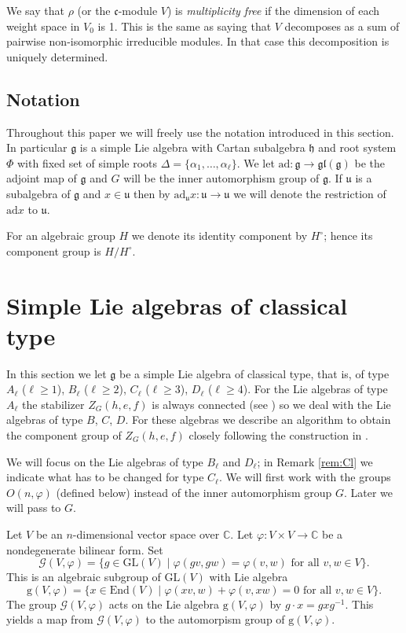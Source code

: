 \documentclass[a4paper,10pt]{amsart}
\newcommand{\C}{\mathbb{C}}
\newcommand{\GL}{\mathrm{GL}}
\newcommand{\mf}{\mathfrak}
\newcommand{\g}{\mf{g}}
\newcommand{\h}{\mf{h}}
\newcommand{\gl}{\mf{gl}}
\newcommand{\uu}{\mf{u}}
\renewcommand{\c}{\mf{c}}
\newcommand{\End}{\mathrm{End}}
\newcommand{\ad}{\mathrm{ad}}
\newcommand{\G}{\mathcal{G}}
\renewcommand{\ggg}{\mathrm{g}}
\numberwithin{equation}{section}
\theoremstyle{remark}
\theoremstyle{remark}
\begin{document}
We say that $\rho$ (or the $\c$-module $V$) is {\em multiplicity free} if
the dimension of each weight space in $V_0$ is 1. This is the same as
saying that $V$ decomposes as a sum of pairwise non-isomorphic irreducible
modules. In that case this decomposition is uniquely determined. 


\subsection{Notation}

Throughout this paper we will freely use the notation introduced in this
section. In particular $\g$ is a simple Lie algebra with Cartan subalgebra
$\h$ and root system $\Phi$ with fixed set of simple roots $\Delta = \{
\alpha_1,\ldots,\alpha_\ell\}$. We let $\ad : \g \to \gl(\g)$ be the
adjoint map of $\g$ and $G$ will be the inner automorphism group of $\g$.
If $\uu$ is a subalgebra of $\g$ and $x\in \uu$ then by $\ad_\uu x :
\uu\to\uu$ we will denote the restriction of $\ad x$ to $\uu$.

For an algebraic group $H$ we denote its identity component by $H^\circ$; hence
its component group is $H/H^\circ$. 

\section{Simple Lie algebras of classical type}\label{sec:classical}

In this section we let $\g$ be a simple Lie algebra of classical type,
that is, of type $A_\ell$ ($\ell\geq 1$), $B_\ell$ ($\ell\geq 2$),
$C_\ell$ ($\ell\geq 3$), $D_\ell$ ($\ell\geq 4$). For the Lie algebras of
type $A_\ell$ the stabilizer $Z_G(h,e,f)$ is always connected (see
\cite[\S 3.5]{sommers}) so we deal with the Lie algebras of type $B$, $C$, $D$.
For these algebras we describe an algorithm to obtain the component group of
$Z_G(h,e,f)$ closely following the construction in \cite[\S 3.1]{jannilp}.

We will focus on the Lie algebras of type $B_\ell$ and $D_\ell$; in Remark
\ref{rem:Cl} we indicate what has to be changed for type $C_\ell$. We will
first work with the groups $O(n,\varphi)$ (defined below) instead of
the inner automorphism group $G$. Later we will pass to $G$. 

Let $V$ be an $n$-dimensional vector space over $\C$. Let $\varphi : V\times
V\to \C$ be a nondegenerate bilinear form. Set
$$\G(V,\varphi) = \{ g\in \GL(V) \mid \varphi(gv,gw) = \varphi(v,w)
\text{ for all } v,w\in V\}.$$
This is an algebraic subgroup of $\GL(V)$ with Lie algebra
$$\ggg(V,\varphi) = \{ x\in \End(V) \mid \varphi(xv,w)+\varphi(v,xw)=0
\text{ for all } v,w\in V\}.$$
The group $\G(V,\varphi)$ acts on the Lie algebra $\ggg(V,\varphi)$ by
$g\cdot x = gxg^{-1}$. This yields a map from $\G(V,\varphi)$
to the automorpism group of $\ggg(V,\varphi)$.
\end{document}
